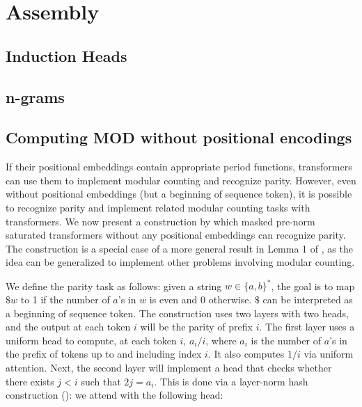 %
\chapter{Assembly}
%



\section{Induction Heads}


\section{n-grams}


\section{Computing MOD without positional encodings}

If their positional embeddings contain appropriate period functions, transformers can use them to implement modular counting and recognize parity.
However, even without positional embeddings (but a beginning of sequence token), it is possible to recognize parity and implement related modular counting tasks with transformers.
We now present a construction by which masked pre-norm saturated transformers without any positional embeddings can recognize parity.
The construction is a special case of a more general result in Lemma 1 of \citet{merrill-2024-little-depth}, as the idea can be generalized to implement other problems involving modular counting.

We define the parity task as follows: given a string $w \in \{a, b\}^*$, the goal is to map $\$ w$ to 1 if the number of $a$'s in $w$ is even and 0 otherwise.
$\$$ can be interpreted as a beginning of sequence token.
The construction uses two layers with two heads, and the output at each token $i$ will be the parity of prefix $i$.
The first layer uses a uniform head to compute, at each token $i$, $a_i / i$, where $a_i$ is the number of $a$'s in the prefix of tokens up to and including index $i$.
It also computes $1/i$ via uniform attention.
Next, the second layer will implement a head that checks whether there exists $j < i$ such that $2j = a_i$.
This is done via a layer-norm hash construction (): we attend with the following head:


